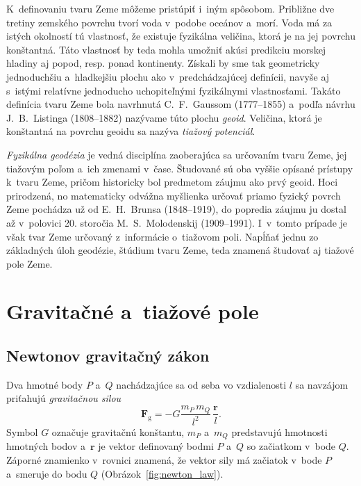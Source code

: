 \documentclass[a4paper, 12pt]{book}
\newcommand{\gidx}{\mathrm g}
\let\vec\mathbf
\begin{document}
K~definovaniu tvaru Zeme môžeme pristúpiť i~iným spôsobom.  Približne dve 
tretiny zemského povrchu tvorí voda v~podobe oceánov a~morí.  Voda má za istých 
okolností tú vlastnosť, že existuje fyzikálna veličina, ktorá je na jej povrchu 
konštantná.  Táto vlastnosť by teda mohla umožniť akúsi predikciu morskej 
hladiny aj popod, resp. ponad kontinenty.  Získali by sme tak geometricky 
jednoduchšiu a~hladkejšiu plochu ako v~predchádzajúcej definícii, navyše aj 
s~istými relatívne jednoducho uchopiteľnými fyzikálnymi vlastnosťami.  Takáto 
definícia tvaru Zeme bola navrhnutá C.~F.~Gaussom (1777--1855) a~podľa návrhu 
J.~B.~Listinga (1808--1882) nazývame túto plochu \emph{geoid}.  Veličina, ktorá 
je konštantná na povrchu geoidu sa nazýva \emph{tiažový potenciál}.

\emph{Fyzikálna geodézia} je vedná disciplína zaoberajúca sa určovaním tvaru 
Zeme, jej tiažovým poľom a~ich zmenami v~čase.  Študované sú oba vyššie opísané 
prístupy k~tvaru Zeme, pričom historicky bol predmetom záujmu ako prvý geoid.  
Hoci prirodzená, no matematicky odvážna myšlienka určovať priamo fyzický povrch 
Zeme pochádza už od E.~H.~Brunsa (1848--1919), do popredia záujmu ju dostal až 
v~polovici 20. storočia M.~S.~Molodenskij (1909--1991).  I~v~tomto prípade je 
však tvar Zeme určovaný z~informácie o~tiažovom poli.  Napĺňať jednu zo 
základných úloh geodézie, štúdium tvaru Zeme, teda znamená študovať aj tiažové 
pole Zeme.







\chapter{Gravitačné a~tiažové pole}
\label{sec:gravitational_and_gravity_field}






\section{Newtonov gravitačný zákon}
\label{sec:newton_law}

Dva hmotné body $P$ a~$Q$ nachádzajúce sa od seba vo vzdialenosti $l$ sa 
navzájom priťahujú \emph{gravitačnou silou}
%
\begin{equation}
\label{eq:newton_law}
\vec F_\gidx = -G \frac{m_P \, m_Q}{l^2} \, \frac{\vec r}{l}{.}
\end{equation}
%
Symbol $G$ označuje gravitačnú konštantu, $m_P$ a~$m_Q$ predstavujú hmotnosti 
hmotných bodov a~$\vec r$ je vektor definovaný bodmi $P$ a~$Q$ so začiatkom 
v~bode $Q$.  Záporné znamienko v~rovnici znamená, že vektor sily má začiatok 
v~bode $P$ a~smeruje do bodu $Q$ (Obrázok~\ref{fig:newton_law}).
\end{document}
